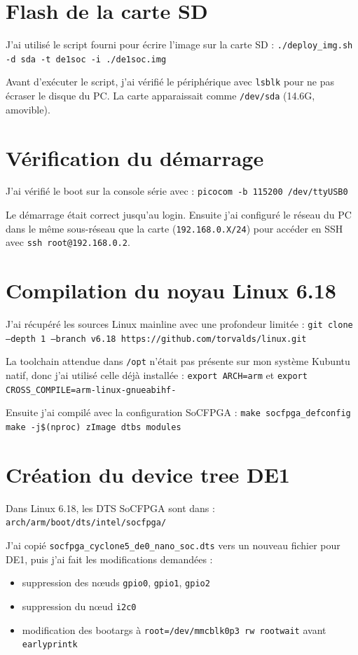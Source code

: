 \documentclass[a4paper,12pt]{article}
\begin{document}
\section{Flash de la carte SD}

J'ai utilisé le script fourni pour écrire l'image sur la carte SD :
\texttt{./deploy\_img.sh -d sda -t de1soc -i ./de1soc.img}

Avant d'exécuter le script, j'ai vérifié le périphérique avec \texttt{lsblk} pour ne pas écraser le disque du PC. La carte apparaissait comme \texttt{/dev/sda} (14.6G, amovible).

\section{Vérification du démarrage}

J'ai vérifié le boot sur la console série avec :
\texttt{picocom -b 115200 /dev/ttyUSB0}

Le démarrage était correct jusqu'au login. Ensuite j'ai configuré le réseau du PC dans le même sous-réseau que la carte (\texttt{192.168.0.X/24}) pour accéder en SSH avec \texttt{ssh root@192.168.0.2}.

\section{Compilation du noyau Linux 6.18}

J'ai récupéré les sources Linux mainline avec une profondeur limitée :
\texttt{git clone --depth 1 --branch v6.18 https://github.com/torvalds/linux.git}

La toolchain attendue dans \texttt{/opt} n'était pas présente sur mon système Kubuntu natif, donc j'ai utilisé celle déjà installée :
\texttt{export ARCH=arm} et \texttt{export CROSS\_COMPILE=arm-linux-gnueabihf-}

Ensuite j'ai compilé avec la configuration SoCFPGA :
\texttt{make socfpga\_defconfig}
\texttt{make -j\$(nproc) zImage dtbs modules}

\newpage

\section{Création du device tree DE1}

Dans Linux 6.18, les DTS SoCFPGA sont dans :
\texttt{arch/arm/boot/dts/intel/socfpga/}

J'ai copié \texttt{socfpga\_cyclone5\_de0\_nano\_soc.dts} vers un nouveau fichier pour DE1, puis j'ai fait les modifications demandées :
\begin{itemize}
    \item suppression des n\oe uds \texttt{gpio0}, \texttt{gpio1}, \texttt{gpio2}
    \item suppression du n\oe ud \texttt{i2c0}
    \item modification des bootargs à \texttt{root=/dev/mmcblk0p3 rw rootwait} avant \texttt{earlyprintk}
\end{itemize}
\end{document}
